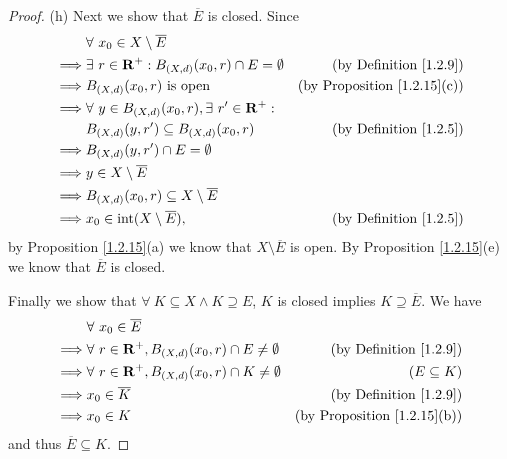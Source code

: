 \begin{proof}{(h)}
    Next we show that \(\overline{E}\) is closed.
    Since
    \begin{align*}
                 & \forall\ x_0 \in X \setminus \overline{E}                                                                     \\
        \implies & \exists\ r \in \mathbf{R}^+ : B_{(X, d)}(x_0, r) \cap E = \emptyset & \text{(by Definition \ref{1.2.9})}      \\
        \implies & B_{(X, d)}(x_0, r) \text{ is open}                                  & \text{(by Proposition \ref{1.2.15}(c))} \\
        \implies & \forall\ y \in B_{(X, d)}(x_0, r), \exists\ r' \in \mathbf{R}^+ :                                             \\
                 & B_{(X, d)}(y, r') \subseteq B_{(X, d)}(x_0, r)                      & \text{(by Definition \ref{1.2.5})}      \\
        \implies & B_{(X, d)}(y, r') \cap E = \emptyset                                                                          \\
        \implies & y \in X \setminus \overline{E}                                                                                \\
        \implies & B_{(X, d)}(x_0, r) \subseteq X \setminus \overline{E}                                                         \\
        \implies & x_0 \in \text{int}(X \setminus \overline{E}),                       & \text{(by Definition \ref{1.2.5})}
    \end{align*}
    by Proposition \ref{1.2.15}(a) we know that \(X \setminus \overline{E}\) is open.
    By Proposition \ref{1.2.15}(e) we know that \(\overline{E}\) is closed.

    Finally we show that \(\forall\ K \subseteq X \land K \supseteq E\), \(K\) is closed implies \(K \supseteq \overline{E}\).
    We have
    \begin{align*}
                 & \forall\ x_0 \in \overline{E}                                                                                   \\
        \implies & \forall\ r \in \mathbf{R}^+, B_{(X, d)}(x_0, r) \cap E \neq \emptyset & \text{(by Definition \ref{1.2.9})}      \\
        \implies & \forall\ r \in \mathbf{R}^+, B_{(X, d)}(x_0, r) \cap K \neq \emptyset & (E \subseteq K)                         \\
        \implies & x_0 \in \overline{K}                                                  & \text{(by Definition \ref{1.2.9})}      \\
        \implies & x_0 \in K                                                             & \text{(by Proposition \ref{1.2.15}(b))}
    \end{align*}
    and thus \(\overline{E} \subseteq K\).
\end{proof}

